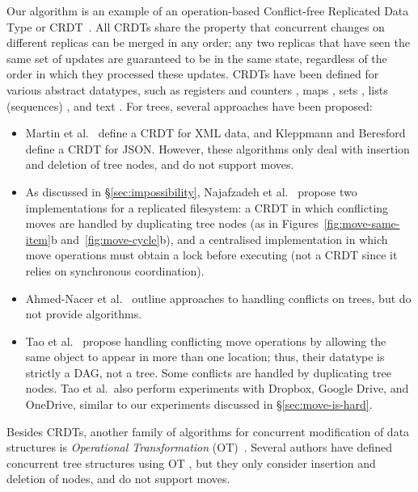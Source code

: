 \documentclass[sigplan,anonymous]{acmart}
\begin{document}
Our algorithm is an example of an operation-based Conflict-free Replicated Data Type or CRDT~\cite{Shapiro:2011wy,Shapiro:2011un,Burckhardt:2014ft}.
All CRDTs share the property that concurrent changes on different replicas can be merged in any order; any two replicas that have seen the same set of updates are guaranteed to be in the same state, regardless of the order in which they processed these updates.
CRDTs have been defined for various abstract datatypes, such as registers and counters \cite{Shapiro:2011wy,Shapiro:2011un}, maps \cite{Baquero:2016iv,Kleppmann:2016ve}, sets \cite{Bieniusa:2012wu,Bieniusa:2012gt}, lists (sequences) \cite{Roh:2011dw,Nedelec:2013ky}, and text \cite{Preguica:2009fz,Weiss:2010hx}.
For trees, several approaches have been proposed:
\begin{itemize}
    \item Martin et al.~\cite{Martin:2010ih} define a CRDT for XML data, and Kleppmann and Beresford~\cite{Kleppmann:2016ve} define a CRDT for JSON.
        However, these algorithms only deal with insertion and deletion of tree nodes, and do not support moves.
    \item As discussed in \S\ref{sec:impossibility}, Najafzadeh et al.~\cite{Najafzadeh:2017vk,Najafzadeh:2018bw} propose two implementations for a replicated filesystem: a CRDT in which conflicting moves are handled by duplicating tree nodes (as in Figures~\ref{fig:move-same-item}b and~\ref{fig:move-cycle}b), and a centralised implementation in which move operations must obtain a lock before executing (not a CRDT since it relies on synchronous coordination).
    \item Ahmed-Nacer et al.~\cite{AhmedNacer:2012us} outline approaches to handling conflicts on trees, but do not provide algorithms.
    \item Tao et al.~\cite{Tao:2015gd} propose handling conflicting move operations by allowing the same object to appear in more than one location; thus, their datatype is strictly a DAG, not a tree.
        Some conflicts are handled by duplicating tree nodes.
        Tao et al.\ also perform experiments with Dropbox, Google Drive, and OneDrive, similar to our experiments discussed in \S\ref{sec:move-is-hard}.
\end{itemize}

Besides CRDTs, another family of algorithms for concurrent modification of data structures is \emph{Operational Transformation} (OT)~\cite{Sun:1998vf}.
Several authors have defined concurrent tree structures using OT \cite{Jungnickel:2016cb,Ignat:2003jy,Davis:2002iv}, but they only consider insertion and deletion of nodes, and do not support moves.
\end{document}
